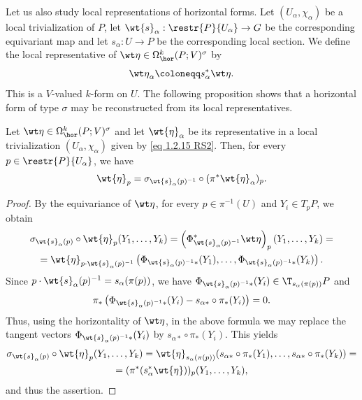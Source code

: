 Let us also study local representations of horizontal forms. Let $(U_\alpha,\chi_\alpha)$ be a local trivialization of $P$, let $\wt{s}_\alpha:\restr{P}{U_\alpha}\to G$ be the corresponding equivariant map and let $s_\alpha:U\to P$ be the corresponding local section. We define the local representative of $\wt\eta\in\Omega^k_{\hor}(P;V)^\sigma$ by
\[{\wt\eta}_\alpha\coloneqq s_\alpha^\ast\wt\eta.\label{eq 1.2.15 RS2}\]
This is a $V$-valued  $k$-form on $U$. The following proposition shows that a horizontal form of type $\sigma$ may be reconstructed from its local representatives.

\begin{prop}[{{\cite[Prop.~1.2.14]{RS2}}}]
    Let $\wt\eta\in \Omega^k_{\hor}(P;V)^\sigma$ and let $\wt{\eta}_\alpha$ be its representative in a local trivialization $(U_\alpha,\chi_\alpha)$ given by \eqref{eq 1.2.15 RS2}. Then, for every $p\in \restr{P}{U_\alpha}$, we have
    \[\wt{\eta}_p=\sigma_{\wt{s}_\alpha(p)^{-1}}\circ (\pi^\ast \wt{\eta}_\alpha)_p.\label{eq 1.2.16 RS2}\]
\end{prop}
\begin{proof}
    By the equivariance of $\wt\eta$, for every $p\in \pi^{-1}(U)$ and $Y_i\in T_pP$, we obtain
    \begin{multline}
        \sigma_{\wt{s}_\alpha(p)}\circ \wt{\eta}_p(Y_1,\ldots,Y_k)=\left(\Phi_{\wt{s}_\alpha(p)^{-1}}^\ast \wt\eta\right)_p (Y_1,\ldots,Y_k)=\\= \wt{\eta}_{p\cdot \wt{s}_\alpha(p)^{-1}} \left(\Phi_{\wt{s}_\alpha(p)^{-1}\ast}(Y_1),\ldots, \Phi_{\wt{s}_\alpha(p)^{-1}\ast}(Y_k) \right).
    \end{multline}
    Since $p\cdot \wt{s}_\alpha(p)^{-1}=s_\alpha(\pi(p))$, we have $\Phi_{\wt{s}_\alpha(p)^{-1}\ast}(Y_i)\in \T_{s_\alpha(\pi(p))}P$ and
    \[\pi_\ast\left(\Phi_{\wt{s}_\alpha(p)^{-1}\ast}(Y_i)-s_{\alpha\ast}\circ \pi_\ast(Y_i)\right)=0.\]
    Thus, using the horizontality of $\wt\eta$, in the above formula we may replace the tangent vectors $\Phi_{\wt{s}_\alpha(p)^{-1}\ast}(Y_i)$ by $s_{\alpha\ast}\circ\pi_\ast(Y_i)$. This yields
    \begin{multline}
        \sigma_{\wt{s}_\alpha(p)}\circ \wt{\eta}_p(Y_1,\ldots,Y_k)=\wt{\eta}_{s_\alpha(\pi(p))}(s_{\alpha\ast}\circ \pi_\ast(Y_1),\ldots,s_{\alpha\ast}\circ\pi_\ast(Y_k))=\\
        =(\pi^\ast(s_\alpha^\ast \wt{\eta}))_p(Y_1,\ldots,Y_k),
    \end{multline}
    and thus the assertion.
\end{proof}

